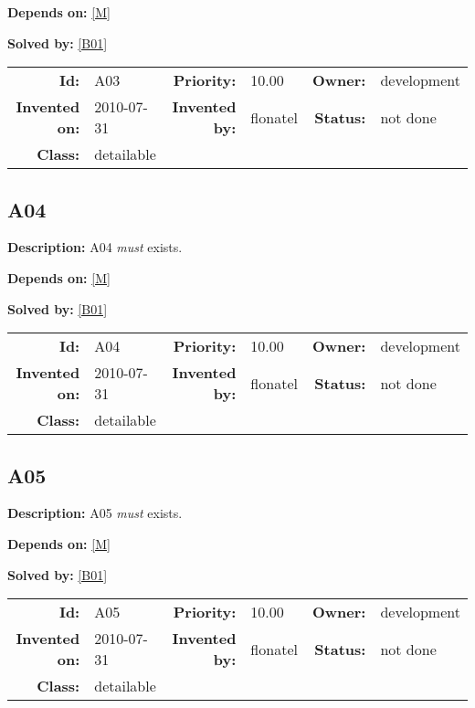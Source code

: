 \textbf{Depends on:} \ref{M} 

\textbf{Solved by:} \ref{B01} 

\par
{\small \begin{center}\begin{tabular}{rlrlrl}
\textbf{Id:} & A03  & \textbf{Priority:} & 10.00  & \textbf{Owner:} & development\\ 
\textbf{Invented on:} & 2010-07-31  & \textbf{Invented by:} & flonatel  & \textbf{Status:} & not done \\ 
\textbf{Class:} & detailable  & & & \end{tabular}\end{center} }

\subsection{A04}\label{A04}
\textbf{Description:} A04 \textsl{must} exists.

\textbf{Depends on:} \ref{M} 

\textbf{Solved by:} \ref{B01} 

\par
{\small \begin{center}\begin{tabular}{rlrlrl}
\textbf{Id:} & A04  & \textbf{Priority:} & 10.00  & \textbf{Owner:} & development\\ 
\textbf{Invented on:} & 2010-07-31  & \textbf{Invented by:} & flonatel  & \textbf{Status:} & not done \\ 
\textbf{Class:} & detailable  & & & \end{tabular}\end{center} }

\subsection{A05}\label{A05}
\textbf{Description:} A05 \textsl{must} exists.

\textbf{Depends on:} \ref{M} 

\textbf{Solved by:} \ref{B01} 

\par
{\small \begin{center}\begin{tabular}{rlrlrl}
\textbf{Id:} & A05  & \textbf{Priority:} & 10.00  & \textbf{Owner:} & development\\ 
\textbf{Invented on:} & 2010-07-31  & \textbf{Invented by:} & flonatel  & \textbf{Status:} & not done \\ 
\textbf{Class:} & detailable  & & & \end{tabular}\end{center} }

